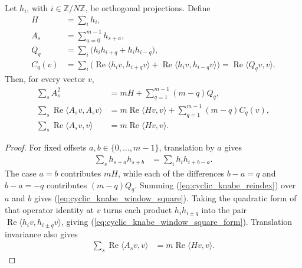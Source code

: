 \begin{lemma}
    \label{thm:cyclic_knabe_double_counting}
    \leanok
    Let $h_i$, with $i\in\mathbb Z/N\mathbb Z$, be orthogonal projections. Define
    \begin{align}
        H      & =\sum_i h_i,                                                \\
        A_s    & =\sum_{a=0}^{m-1}h_{s+a},                                   \\
        Q_q    & =\sum_i\bigl(h_i h_{i+q}+h_i h_{i-q}\bigr),                 \\
        C_q(v) & =\sum_i\bigl(\operatorname{Re}\langle h_i v,h_{i+q}v\rangle
        +\operatorname{Re}\langle h_i v,h_{i-q}v\rangle\bigr)
        =\operatorname{Re}\langle Q_qv,v\rangle.
    \end{align}
    Then, for every vector $v$,
    \begin{align}
        \sum_s A_s^2
         & =mH+\sum_{q=1}^{m-1}(m-q)Q_q,\label{eq:cyclic_knabe_window_square}   \\
        \sum_s\operatorname{Re}\langle A_sv,A_sv\rangle
         & =m\operatorname{Re}\langle Hv,v\rangle
        +\sum_{q=1}^{m-1}(m-q)C_q(v),\label{eq:cyclic_knabe_window_square_form} \\
        \sum_s\operatorname{Re}\langle A_s v,v\rangle
         & =m\operatorname{Re}\langle Hv,v\rangle.
    \end{align}
\end{lemma}

\begin{proof}
    \leanok
    For fixed offsets $a,b\in\{0,\ldots,m-1\}$, translation by $a$ gives
    \begin{align}
        \sum_s h_{s+a}h_{s+b}
         & =\sum_i h_i h_{i+b-a}.\label{eq:cyclic_knabe_reindex}
    \end{align}
    The case $a=b$ contributes $mH$, while each of the differences
    $b-a=q$ and $b-a=-q$ contributes $(m-q)Q_q$. Summing
    (\ref{eq:cyclic_knabe_reindex}) over $a$ and $b$ gives
    (\ref{eq:cyclic_knabe_window_square}). Taking the quadratic form of
    that operator identity at $v$ turns each product $h_ih_{i\pm q}$ into
    the pair $\operatorname{Re}\langle h_iv,h_{i\pm q}v\rangle$, giving
    (\ref{eq:cyclic_knabe_window_square_form}). Translation invariance also gives
    \begin{align}
        \sum_s \operatorname{Re}\langle A_s v,v\rangle
         & =m\operatorname{Re}\langle Hv,v\rangle.
        \label{eq:cyclic_knabe_window_linear}
    \end{align}
\end{proof}

